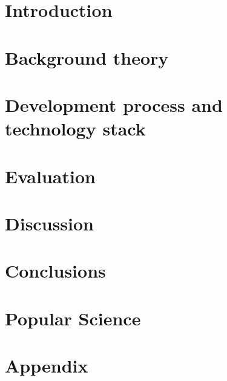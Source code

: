 \documentclass[nofilelist,dvipsnames]{cslthse-msc}
\begin{document}



\tableofcontents

\chapter{Introduction}

  

\chapter{Background theory}

  

\chapter{Development process and technology stack}

  

\chapter{Evaluation}

  

\chapter{Discussion}

  

\chapter{Conclusions}

  

\chapter{Popular Science}

  


\chapter{Appendix}

  
\end{document}
